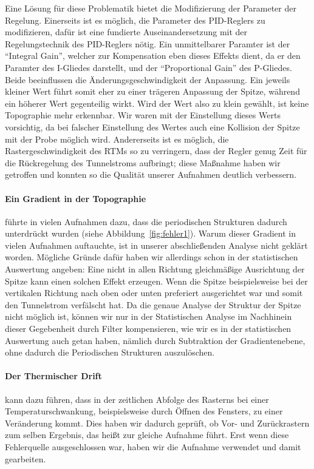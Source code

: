 Eine Lösung für diese Problematik bietet die Modifizierung der Parameter der Regelung. 
Einerseits ist es möglich, die Parameter des PID-Reglers zu modifizieren, dafür
ist eine fundierte Auseinandersetzung mit der Regelungstechnik des PID-Reglers nötig.
Ein unmittelbarer Paramter ist der ``Integral Gain'', welcher zur Kompensation eben dieses
Effekts dient, da er den Paramter des I-Gliedes darstellt,
und der ``Proportional Gain'' des P-Gliedes. Beide beeinflussen die Änderungsgeschwindigkeit
der Anpassung. Ein jeweils kleiner Wert führt somit eher zu einer trägeren Anpassung
der Spitze, während ein höherer Wert gegenteilig wirkt. Wird der Wert also zu klein gewählt,
ist keine Topographie mehr erkennbar. Wir waren mit der Einstellung dieses Werts vorsichtig,
da bei falscher Einstellung des Wertes auch eine Kollision der Spitze mit der Probe möglich wird.
Andererseits ist es möglich, die Rastergeschwindigkeit des RTMs so zu verringern, dass der
Regler genug Zeit für die Rückregelung des Tunnelstroms aufbringt; diese Maßnahme haben wir 
getroffen und konnten so die Qualität unserer Aufnahmen deutlich verbessern.
\paragraph{Ein Gradient in der Topographie} führte in vielen Aufnahmen
dazu, dass die periodischen Strukturen dadurch unterdrückt wurden (siehe Abbildung~\ref{fig:fehler1}).
Warum dieser Gradient in vielen Aufnahmen auftauchte, ist in unserer abschließenden Analyse
nicht geklärt worden. Mögliche Gründe dafür haben wir allerdings schon in der statistischen Auswertung
angeben: Eine nicht in allen Richtung gleichmäßige Ausrichtung der Spitze kann einen solchen
Effekt erzeugen. Wenn die Spitze beispielsweise 
bei der vertikalen Richtung nach oben oder unten preferiert ausgerichtet
war und somit den Tunnelstrom verfälscht hat.
Da die genaue Analyse der Struktur der Spitze nicht möglich ist, können wir nur in der 
Statistischen Analyse im Nachhinein dieser Gegebenheit durch Filter kompensieren, wie wir es
in der statistischen Auswertung auch getan haben, nämlich durch Subtraktion der Gradientenebene,
ohne dadurch die Periodischen Strukturen auszulöschen.
\paragraph{Der Thermischer Drift} kann dazu führen, dass in der zeitlichen Abfolge des Rasterns
bei einer Temperaturschwankung, beispielsweise durch Öffnen des Fensters, zu einer Veränderung
kommt. Dies haben wir dadurch geprüft, ob Vor- und Zurückrastern zum selben Ergebnis, das heißt
zur gleiche Aufnahme führt. Erst wenn diese Fehlerquelle ausgeschlossen war, haben wir 
die Aufnahme verwendet und damit gearbeiten.

